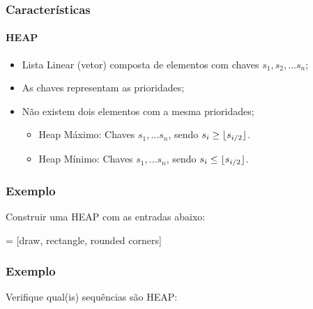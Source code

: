 \documentclass[10pt]{beamer}
\begin{document}
\DeclarePairedDelimiter\floor{\lfloor}{\rfloor}
\begin{frame}
    \frametitle{Características}
    \framesubtitle{HEAP}
    \begin{itemize}[<+-|alert@+>]
        \large\setlength{\itemsep}{1em}
              \color{cinza}
        \item Lista Linear (vetor) composta de elementos com chaves $s_1, s_2, \ldots s_n$;
        \item As chaves representam as prioridades;
        \item Não existem dois elementos com a mesma prioridades;\vspace*{1em}
              \begin{itemize}\setlength{\itemsep}{1em}
                        \large
                  \item Heap Máximo: Chaves $s_1, \ldots s_n$, sendo $s_i \geq \floor{s_{i/2}}$.
                  \item Heap Mínimo: Chaves $s_1, \ldots s_n$, sendo $s_i \leq \floor{ s_{i/2}}$.
              \end{itemize}
    \end{itemize}
\end{frame}

\begin{frame}[t]
    \frametitle{Exemplo}
    \large
    Construir uma HEAP com as entradas abaixo:

    \center
     = [draw, rectangle, rounded corners]
    \vfill
\end{frame}

\begin{frame}[t]
    \frametitle{Exemplo}
    \Large
    Verifique qual(is) sequências são HEAP:\vfill

    \center
    \vfill
\end{frame}
\end{document}
